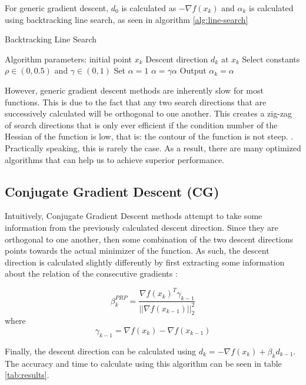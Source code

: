 \documentclass[12pt,conference]{IEEEtran}
\begin{document}
For generic gradient descent, $d_0$ is calculated as $-\nabla f(x_k)$ and $\alpha_k$ is calculated using backtracking line search, as seen in algorithm \ref{alg:line-search}

\begin{algorithm}
\caption{Backtracking Line Search \cite{course-notes}}
\label{alg:line-search}
\begin{algorithmic}[1]
\State Algorithm parameters: initial point $x_k$
\State Descent direction $d_k$ at $x_k$
\State Select constants $\rho \in (0, 0.5)$ and $\gamma \in (0,1)$
\State Set $\alpha=1$
    \State $\alpha = \gamma \alpha$
\EndWhile 
\State Output $\alpha_k = \alpha$
\end{algorithmic}
\end{algorithm}

However, generic gradient descent methods are inherently slow for most functions. This is due to the fact that any two search directions that are successively calculated will be orthogonal to one another. This creates a zig-zag of search directions that is only ever efficient if the condition number of the Hessian of the function is low, that is: the contour of the function is not steep. \cite{course-notes}. Practically speaking, this is rarely the case. As a result, there are many optimized algorithms that can help us to achieve superior performance.

\subsection {Conjugate Gradient Descent (CG)}
Intuitively, Conjugate Gradient Descent methods attempt to take some information from the previously calculated descent direction. Since they are orthogonal to one another, then some combination of the two descent directions points towards the actual minimizer of the function. As such, the descent direction is calculated slightly differently by first extracting some information about the relation of the consecutive gradients \cite{course-notes}:

$$\beta_k^{PRP} = \frac{\nabla f(x_k)^T \gamma_{k-1}}{||\nabla f(x_{k-1})||^2_2} $$ where
$$\gamma_{k-1} = \nabla f(x_k) - \nabla f(x_{k-1})$$

Finally, the descent direction can be calculated using $d_k = -\nabla f(x_k) + \beta_kd_{k-1}$. The accuracy and time to calculate using this algorithm can be seen in table \ref{tab:results}.
\end{document}
